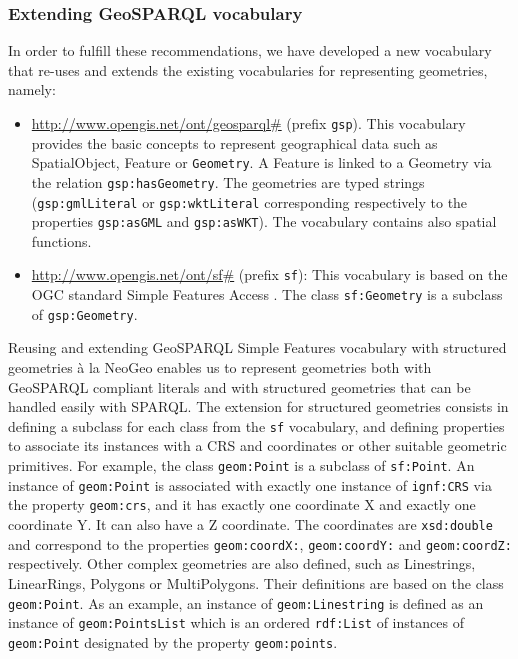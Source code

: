 \subsubsection{Extending GeoSPARQL vocabulary}
In order to fulfill these recommendations, we have developed a new vocabulary that re-uses and extends the existing vocabularies for representing geometries, namely:
\begin{itemize}
 \item \url{http://www.opengis.net/ont/geosparql#} (prefix \texttt{gsp}). This vocabulary provides the basic concepts to represent geographical data such as SpatialObject, Feature or \texttt{Geometry}. A Feature is linked to a Geometry via the relation \texttt{gsp:hasGeometry}. The geometries are typed strings (\texttt{gsp:gmlLiteral} or \texttt{gsp:wktLiteral} corresponding respectively to the properties \texttt{gsp:asGML} and \texttt{gsp:asWKT}). The vocabulary contains also spatial functions.
 \item \url{http://www.opengis.net/ont/sf#} (prefix \texttt{sf}): This vocabulary is based on the OGC standard Simple Features Access \cite{iso2004}. The class \texttt{sf:Geometry} is a subclass of \texttt{gsp:Geometry}. 
\end{itemize}
 
Reusing and extending GeoSPARQL Simple Features vocabulary with structured geometries  \`a la NeoGeo enables us to represent geometries both with GeoSPARQL compliant literals and with structured geometries that can be handled easily with SPARQL. The extension for structured geometries consists in defining a subclass for each class from the \texttt{sf} vocabulary, and defining properties to associate its instances with a CRS and coordinates or other suitable geometric primitives. For example, the class \texttt{geom:Point} is a subclass of \texttt{sf:Point}. An instance of \texttt{geom:Point} is associated with exactly one instance of \texttt{ignf:CRS} via the property \texttt{geom:crs}, and it
has exactly one coordinate X and exactly one coordinate Y. It can also have a Z coordinate. The coordinates are \texttt{xsd:double} and correspond to the properties \texttt{geom:coordX:}, \texttt{geom:coordY:} and \texttt{geom:coordZ:} respectively. Other complex geometries are also defined, such as Linestrings, LinearRings, Polygons or MultiPolygons. Their definitions are based on the class \texttt{geom:Point}. As an example, an instance of \texttt{geom:Linestring} is defined as an instance of \texttt{geom:PointsList} which is an ordered \texttt{rdf:List} of instances of \texttt{geom:Point} designated by the property \texttt{geom:points}.


